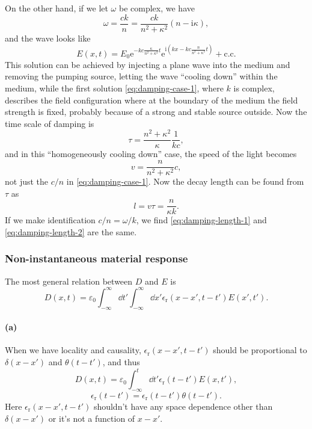 \documentclass[hyperref, a4paper]{article}
\newcommand*{\ii}{\mathrm{i}}
\newcommand*{\ee}{\mathrm{e}}
\newcommand{\epsr}{\epsilon_{\text{r}}}
\begin{document}
On the other hand, if we let $\omega$ be complex, 
we have 
\begin{equation}
    \omega = \frac{ck}{n} = \frac{ck}{n^2 + \kappa^2} (n - \ii \kappa),
\end{equation}
and the wave looks like 
\begin{equation}
    E(x, t) = E_0 \ee^{
        - k c \frac{\kappa}{n^2 + \kappa^2} t 
    } \ee^{
        \ii \left(
            kx - k c \frac{n}{n^2 + \kappa^2} t
        \right)
    } + \text{c.c.}
\end{equation}
This solution can be achieved by injecting a plane wave into the medium 
and removing the pumping source, 
letting the wave ``cooling down'' within the medium,
while the first solution \eqref{eq:damping-case-1}, where $k$ is complex, 
describes the field configuration where at the boundary of the medium 
the field strength is fixed, 
probably because of a strong and stable source outside.
Now the time scale of damping is 
\begin{equation}
    \tau = \frac{n^2 + \kappa^2}{\kappa} \frac{1}{kc},
\end{equation}
and in this ``homogeneously cooling down'' case, 
the speed of the light becomes 
\begin{equation}
    v = \frac{n}{n^2 + \kappa^2} c,
\end{equation}
not just the $c / n$ in \eqref{eq:damping-case-1}.
Now the decay length can be found from $\tau$ as 
\begin{equation}
    l = v \tau = \frac{n}{\kappa k}.
    \label{eq:damping-length-2}
\end{equation}
If we make identification $c / n = \omega / k$,
we find \eqref{eq:damping-length-1} and \eqref{eq:damping-length-2} are the same.

\subsubsection{Non-instantaneous material response}

The most general relation between $D$ and $E$ is 
\begin{equation}
    D(x, t) = \varepsilon_0 \int_{-\infty}^{\infty} \dd{t'} 
    \int_{-\infty}^{\infty} \dd{x'} 
    \epsr(x - x', t - t') E(x', t').
\end{equation}

\paragraph{(a)} When we have locality and causality, 
$\epsr(x - x', t - t')$ should be proportional to 
$\delta(x - x')$ and $\theta(t - t')$,
and thus 
\begin{equation}
    D(x, t) = \varepsilon_0 \int_{-\infty}^{t} \dd{t'} 
    \epsr(t - t') E(x, t'), 
\end{equation}
\begin{equation}
    \epsr(t - t') = \epsr(t - t') \theta(t - t').
\end{equation}
Here $\epsr(x - x', t - t')$ shouldn't have any space dependence 
other than $\delta(x - x')$ or it's not a function of $x - x'$.
\end{document}
